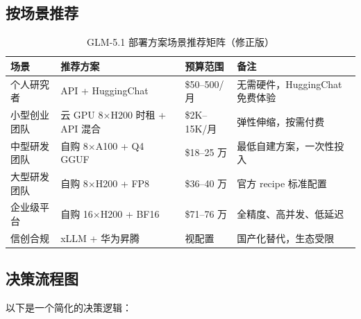 \documentclass[UTF8,a4paper,10pt,oneside]{ctexart}
\begin{document}
\subsection{按场景推荐}

\begin{table}[htbp]
\centering
\caption{GLM-5.1 部署方案场景推荐矩阵（修正版）}
\begin{tabular}{p{2.5cm}p{3.2cm}p{2.8cm}p{3.5cm}}
\hline
\textbf{场景} & \textbf{推荐方案} & \textbf{预算范围} & \textbf{备注} \\
\hline
个人研究者 & API + HuggingChat & \$50--500/月 & 无需硬件，HuggingChat 免费体验 \\
小型创业团队 & 云 GPU 8$\times$H200 时租 + API 混合 & \$2K--15K/月 & 弹性伸缩，按需付费 \\
中型研发团队 & 自购 8$\times$A100 + Q4 GGUF & \$18--25 万 & 最低自建方案，一次性投入 \\
大型研发团队 & 自购 8$\times$H200 + FP8 & \$36--40 万 & 官方 recipe 标准配置 \\
企业级平台 & 自购 16$\times$H200 + BF16 & \$71--76 万 & 全精度、高并发、低延迟 \\
信创合规 & xLLM + 华为昇腾 & 视配置 & 国产化替代，生态受限 \\
\hline
\end{tabular}
\end{table}

\subsection{决策流程图}

以下是一个简化的决策逻辑：
\end{document}
